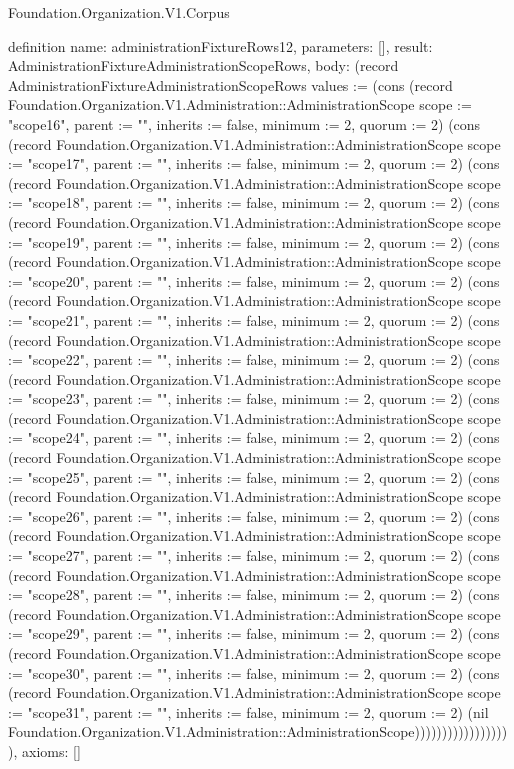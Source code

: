 \begin{lexlean}{Foundation.Organization.V1.Corpus}
\begin{semanticmodule}
definition{
  name: administrationFixtureRows12,
  parameters: [],
  result: AdministrationFixtureAdministrationScopeRows,
  body: (record AdministrationFixtureAdministrationScopeRows {values := (cons (record Foundation.Organization.V1.Administration::AdministrationScope {scope := "scope16", parent := "", inherits := false, minimum := 2, quorum := 2}) (cons (record Foundation.Organization.V1.Administration::AdministrationScope {scope := "scope17", parent := "", inherits := false, minimum := 2, quorum := 2}) (cons (record Foundation.Organization.V1.Administration::AdministrationScope {scope := "scope18", parent := "", inherits := false, minimum := 2, quorum := 2}) (cons (record Foundation.Organization.V1.Administration::AdministrationScope {scope := "scope19", parent := "", inherits := false, minimum := 2, quorum := 2}) (cons (record Foundation.Organization.V1.Administration::AdministrationScope {scope := "scope20", parent := "", inherits := false, minimum := 2, quorum := 2}) (cons (record Foundation.Organization.V1.Administration::AdministrationScope {scope := "scope21", parent := "", inherits := false, minimum := 2, quorum := 2}) (cons (record Foundation.Organization.V1.Administration::AdministrationScope {scope := "scope22", parent := "", inherits := false, minimum := 2, quorum := 2}) (cons (record Foundation.Organization.V1.Administration::AdministrationScope {scope := "scope23", parent := "", inherits := false, minimum := 2, quorum := 2}) (cons (record Foundation.Organization.V1.Administration::AdministrationScope {scope := "scope24", parent := "", inherits := false, minimum := 2, quorum := 2}) (cons (record Foundation.Organization.V1.Administration::AdministrationScope {scope := "scope25", parent := "", inherits := false, minimum := 2, quorum := 2}) (cons (record Foundation.Organization.V1.Administration::AdministrationScope {scope := "scope26", parent := "", inherits := false, minimum := 2, quorum := 2}) (cons (record Foundation.Organization.V1.Administration::AdministrationScope {scope := "scope27", parent := "", inherits := false, minimum := 2, quorum := 2}) (cons (record Foundation.Organization.V1.Administration::AdministrationScope {scope := "scope28", parent := "", inherits := false, minimum := 2, quorum := 2}) (cons (record Foundation.Organization.V1.Administration::AdministrationScope {scope := "scope29", parent := "", inherits := false, minimum := 2, quorum := 2}) (cons (record Foundation.Organization.V1.Administration::AdministrationScope {scope := "scope30", parent := "", inherits := false, minimum := 2, quorum := 2}) (cons (record Foundation.Organization.V1.Administration::AdministrationScope {scope := "scope31", parent := "", inherits := false, minimum := 2, quorum := 2}) (nil Foundation.Organization.V1.Administration::AdministrationScope)))))))))))))))))}),
  axioms: []
}


\end{semanticmodule}
\end{lexlean}
